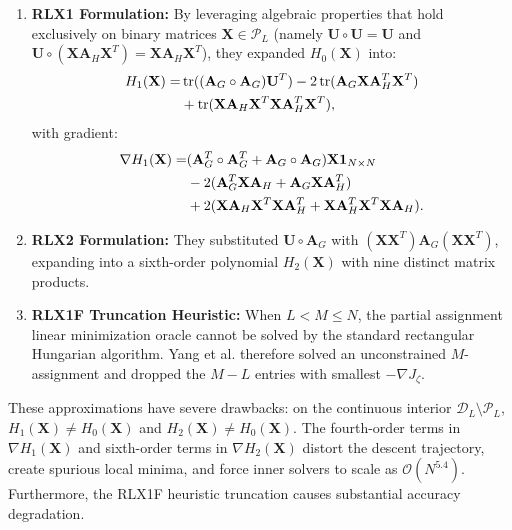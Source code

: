 \documentclass[conference]{IEEEtran}
\begin{document}
\begin{enumerate}
    \item \textbf{RLX1 Formulation:} By leveraging algebraic properties that hold exclusively on binary matrices $\mathbf{X} \in \mathcal{P}_L$ (namely $\mathbf{U}\circ\mathbf{U} = \mathbf{U}$ and $\mathbf{U} \circ (\mathbf{X}\mathbf{A}_H\mathbf{X}^T) = \mathbf{X}\mathbf{A}_H\mathbf{X}^T$), they expanded $H_0(\mathbf{X})$ into:
    \begin{align}
    H_1(\mathbf{X}) = &\operatorname{tr}((\mathbf{A}_G \circ \mathbf{A}_G)\mathbf{U}^T) - 2\operatorname{tr}(\mathbf{A}_G\mathbf{X}\mathbf{A}_H^T\mathbf{X}^T) \notag\\
    &+ \operatorname{tr}(\mathbf{X}\mathbf{A}_H\mathbf{X}^T\mathbf{X}\mathbf{A}_H^T\mathbf{X}^T),
    \label{eq:rlx1}
    \end{align}
    with gradient:
    \begin{align}
    \nabla H_1(\mathbf{X}) = &(\mathbf{A}_G^T \circ \mathbf{A}_G^T + \mathbf{A}_G \circ \mathbf{A}_G)\mathbf{X}\mathbf{1}_{N\times N} \notag\\
    &- 2(\mathbf{A}_G^T\mathbf{X}\mathbf{A}_H + \mathbf{A}_G\mathbf{X}\mathbf{A}_H^T) \notag\\
    &+ 2(\mathbf{X}\mathbf{A}_H\mathbf{X}^T\mathbf{X}\mathbf{A}_H^T + \mathbf{X}\mathbf{A}_H^T\mathbf{X}^T\mathbf{X}\mathbf{A}_H).
    \label{eq:rlx1_grad}
    \end{align}
    \item \textbf{RLX2 Formulation:} They substituted $\mathbf{U}\circ\mathbf{A}_G$ with $(\mathbf{X}\mathbf{X}^T)\mathbf{A}_G(\mathbf{X}\mathbf{X}^T)$, expanding into a sixth-order polynomial $H_2(\mathbf{X})$ with nine distinct matrix products.
    \item \textbf{RLX1F Truncation Heuristic:} When $L < M \leq N$, the partial assignment linear minimization oracle cannot be solved by the standard rectangular Hungarian algorithm. Yang et al. therefore solved an unconstrained $M$-assignment and dropped the $M - L$ entries with smallest $-\nabla J_\zeta$.
\end{enumerate}

These approximations have severe drawbacks: on the continuous interior $\mathcal{D}_L \setminus \mathcal{P}_L$, $H_1(\mathbf{X}) \neq H_0(\mathbf{X})$ and $H_2(\mathbf{X}) \neq H_0(\mathbf{X})$. The fourth-order terms in $\nabla H_1(\mathbf{X})$ and sixth-order terms in $\nabla H_2(\mathbf{X})$ distort the descent trajectory, create spurious local minima, and force inner solvers to scale as $\mathcal{O}(N^{5.4})$. Furthermore, the RLX1F heuristic truncation causes substantial accuracy degradation.
\end{document}
